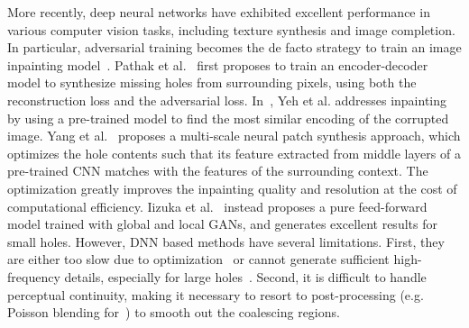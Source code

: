 \documentclass[runningheads]{llncs}
\begin{document}
More recently, deep neural networks have exhibited excellent performance in various computer vision tasks, including texture synthesis and image completion. In particular, adversarial training becomes the de facto strategy to train an image inpainting model~\cite{pathak2016context,yeh2016semantic,li2017generative,yang2017high,iizuka2017globally}. Pathak et al.~\cite{pathak2016context} first proposes to train an encoder-decoder model to synthesize missing holes from surrounding pixels, using both the reconstruction loss and the adversarial loss. In~\cite{yeh2016semantic}, Yeh et al. addresses inpainting by using a pre-trained model to find the most similar encoding of the corrupted image. Yang et al.~\cite{yang2017high} proposes a multi-scale neural patch synthesis approach, which optimizes the hole contents such that its feature extracted from middle layers of a pre-trained CNN matches with the features of the surrounding context. The optimization greatly improves the inpainting quality and resolution at the cost of computational efficiency. Iizuka et al.~\cite{iizuka2017globally} instead proposes a pure feed-forward model trained with global and local GANs, and generates excellent results for small holes. However, DNN based methods have several limitations. First, they are either too slow due to optimization~\cite{yang2017high} or cannot generate sufficient high-frequency details, especially for large holes~\cite{iizuka2017globally}. Second, it is difficult to handle perceptual continuity, making it necessary to resort to post-processing (e.g. Poisson blending for~\cite{iizuka2017globally}) to smooth out the coalescing regions.
\end{document}
